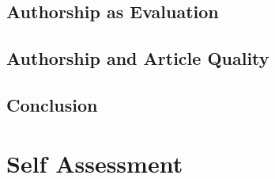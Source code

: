 \documentclass[preprint,review,12pt]{elsarticle}
\begin{document}
\subsection{Authorship as Evaluation}

\subsection{Authorship and Article Quality}

\subsection{Conclusion}

\section{Self Assessment}





% 



\section{\refname}


\end{document}

